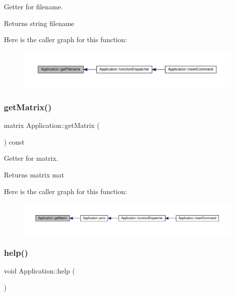 Getter for filename. \begin{DoxyReturn}{Returns}
string filename 
\end{DoxyReturn}
Here is the caller graph for this function\+:
\nopagebreak
\begin{figure}[H]
\begin{center}
\leavevmode
\includegraphics[width=350pt]{class_application_a778575fb76de5352152d8928e1c3410f_icgraph}
\end{center}
\end{figure}
\mbox{\label{class_application_a67aeb617ca44a18045612d92f1d8afa0}} 
\subsubsection{\texorpdfstring{get\+Matrix()}{getMatrix()}}
{\footnotesize\ttfamily matrix Application\+::get\+Matrix (\begin{DoxyParamCaption}{ }\end{DoxyParamCaption}) const\hspace{0.3cm}{\ttfamily [inline]}}

Getter for matrix. \begin{DoxyReturn}{Returns}
matrix mat 
\end{DoxyReturn}
Here is the caller graph for this function\+:
\nopagebreak
\begin{figure}[H]
\begin{center}
\leavevmode
\includegraphics[width=350pt]{class_application_a67aeb617ca44a18045612d92f1d8afa0_icgraph}
\end{center}
\end{figure}
\mbox{\label{class_application_a2c6518d7f121299d9be8c66d31997fbc}} 
\subsubsection{\texorpdfstring{help()}{help()}}
{\footnotesize\ttfamily void Application\+::help (\begin{DoxyParamCaption}{ }\end{DoxyParamCaption})\hspace{0.3cm}{\ttfamily [private]}}

